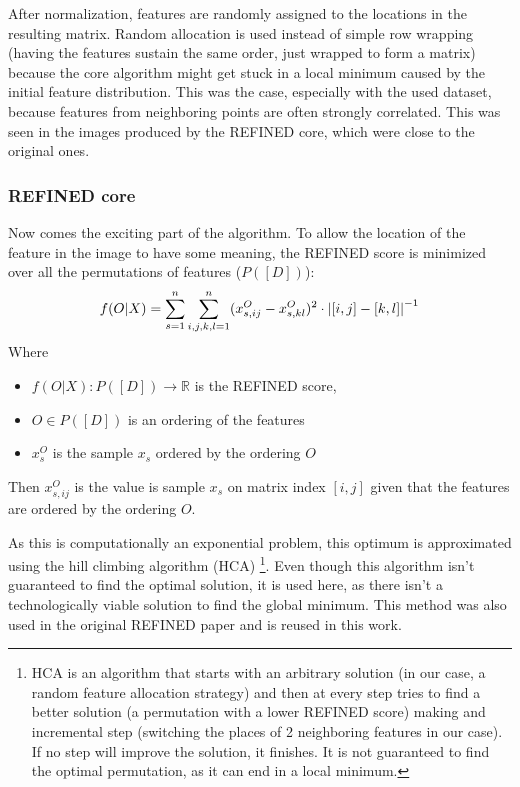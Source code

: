 After normalization, features are randomly assigned to the locations in the resulting matrix. Random allocation is used instead of simple row wrapping (having the features sustain the same order, just wrapped to form a matrix) because the core algorithm might get stuck in a local minimum caused by the initial feature distribution. This was the case, especially with the used dataset, because features from neighboring points are often strongly correlated. This was seen in the images produced by the REFINED core, which were close to the original ones.

\subsubsection{REFINED core}
\label{REFINED_core}
Now comes the exciting part of the algorithm.  To allow the location of the feature in the image to have some meaning, the REFINED score is minimized over all the permutations of features ($P([D])$): 
    $$ f(O|X) = \sum_{s=1}^{n} \sum_{i, j, k, l =1}^n (x^O_{s, ij} - x^O_{s, kl})^2 \cdot \left|{[i,j] - [k,l]}\right|^{-1}$$
Where
\begin{itemize}
    \item $f(O|X): P([D]) \rightarrow \mathbb{R}$ is the REFINED score,
    \item $O \in P([D])$ is an ordering of the features
    \item $x^O_s$ is the sample $x_s$ ordered by the ordering $O$
\end{itemize}
Then $x^O_{s, ij}$ is the value is sample $x_s$ on matrix index $[i,j]$ given that the features are ordered by the ordering $O$.

As this is computationally an exponential problem, this optimum is approximated using the hill climbing algorithm (HCA) \footnote{HCA is an algorithm that starts with an arbitrary solution (in our case, a random feature allocation strategy) and then at every step tries to find a better solution (a permutation with a lower REFINED score) making and incremental step (switching the places of 2 neighboring features in our case). If no step will improve the solution, it finishes. It is not guaranteed to find the optimal permutation, as it can end in a local minimum.}. Even though this algorithm isn't guaranteed to find the optimal solution, it is used here, as there isn't a technologically viable solution to find the global minimum. This method was also used in the original REFINED paper and is reused in this work.

